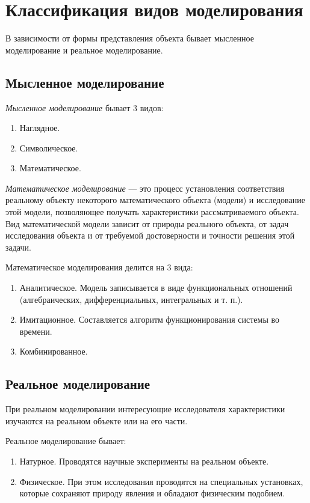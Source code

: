 \documentclass[12pt, russian, oneside, article]{ncc}
\begin{document}
\section{Классификация видов моделирования}
\label{sec-2}


В зависимости от формы представления объекта бывает мысленное моделирование и реальное моделирование.
\subsection{Мысленное моделирование}
\label{sec-2_1}


\emph{Мысленное моделирование} бывает 3 видов:
\begin{enumerate}
\item Наглядное.
\item Символическое.
\item Математическое.
\end{enumerate}

\emph{Математическое моделирование} --- это процесс установления соответствия реальному объекту некоторого математического объекта (модели) и исследование этой модели, позволяющее получать характеристики рассматриваемого объекта. Вид математической модели зависит от природы реального объекта, от задач исследования объекта и от требуемой достоверности и точности решения этой задачи.

Математическое моделирования делится на 3 вида:
\begin{enumerate}
\item Аналитическое. Модель записывается в виде функциональных отношений (алгебраических, дифференциальных, интегральных и т. п.).
\item Имитационное. Составляется алгоритм функционирования системы во времени.
\item Комбинированное.
\end{enumerate}
\subsection{Реальное моделирование}
\label{sec-2_2}


При реальном моделировании интересующие исследователя характеристики изучаются на реальном объекте или на его части.

Реальное моделирование бывает:
\begin{enumerate}
\item Натурное. Проводятся научные эксперименты на реальном объекте.
\item Физическое. При этом исследования проводятся на специальных установках, которые сохраняют природу явления и обладают физическим подобием.
\end{enumerate}
\end{document}
